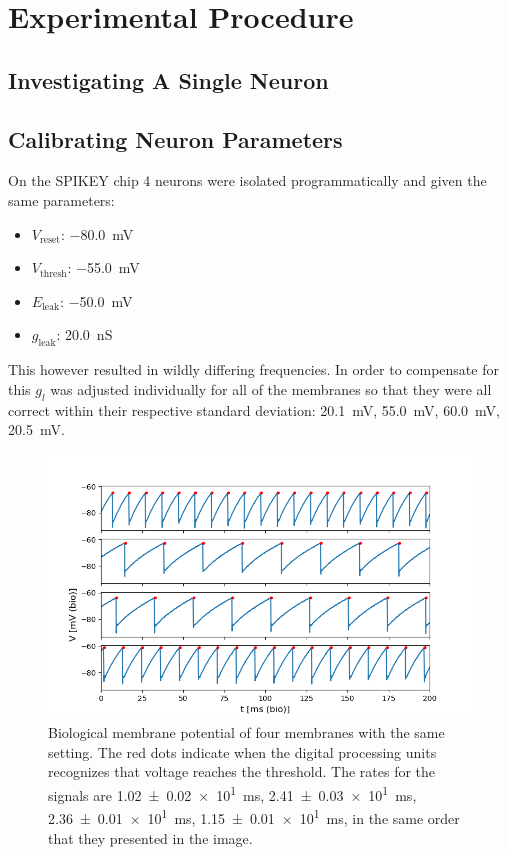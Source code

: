 \documentclass[10pt,a4paper]{article}
\begin{document}
\section{Experimental Procedure}

\subsection{Investigating A Single Neuron}

\subsection{Calibrating Neuron Parameters}
On the SPIKEY chip 4 neurons were isolated programmatically and given the same
parameters:
\begin{itemize}
    \item $V_\text{reset}$: \SI{-80.0}{\milli\volt}
    \item $V_\text{thresh}$: \SI{-55.0}{\milli\volt}
    \item $E_\text{leak}$: \SI{-50.0}{\milli\volt}
    \item $g_\text{leak}$:  \SI{20.0}{\nano\siemens}
\end{itemize}

This however resulted in wildly differing frequencies. In order to compensate
for this $g_l$ was adjusted individually for all of the membranes so that they
were all correct within their respective standard deviation:
\SI{20.1}{\milli\volt}, \SI{55.0}{\milli\volt}, \SI{60.0}{\milli\volt},
\SI{20.5}{\milli\volt}.

\begin{figure}[ht]
    \centering
    \includegraphics[width=.5\textwidth]{figures/4membranes.png}
    \caption{Biological membrane potential of four membranes with the same
    setting. The red dots indicate when the digital processing units recognizes
    that voltage reaches the threshold. The rates for the signals are
    \SI{1.02(2)e1}{\milli\second}, \SI{2.41(3)e1}{\milli\second},
    \SI{2.36(1)e1}{\milli\second}, \SI{1.15(1)e1}{\milli\second}, in the same
    order that they presented in the image. }
    \label{fig:4membranes}
\end{figure}
\end{document}
